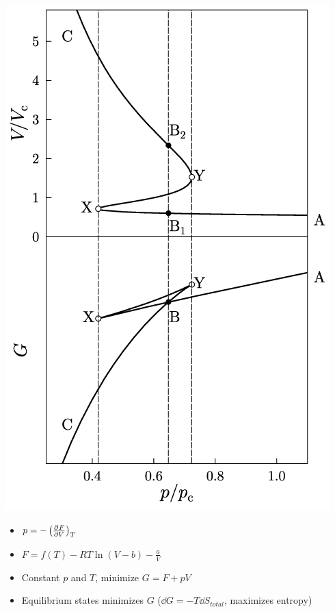 \documentclass{article}
\theoremstyle{remark}
\newcommand{\ppdv}[4][]{\left(\pdv[#1]{#2}{#3}\right)_{#4}}
\begin{document}
\begin{enumerate}
\begin{itemize}
\begin{minipage}{0.4\linewidth}
                    \includegraphics*[width=\linewidth]{van_der_waal_G.png}
                \end{minipage}
                \begin{minipage}{0.6\linewidth}
                    \begin{itemize}
                        \item $p=-\ppdv{F}{V}{T}$
                        \item $F=f(T)-RT\ln(V-b)-\frac{a}{V}$
                        \item Constant $p$ and $T$, minimize $G=F+pV$
                        \item Equilibrium states minimizes $G$ ($\dd G=-T\dd S_{total}$, maximizes entropy)

\end{itemize}
\end{minipage}
\end{itemize}
\end{enumerate}
\end{document}
